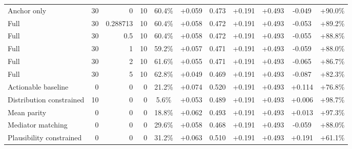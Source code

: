 \begin{table}[htbp]
\begin{tabular}{lrrrccccccc}
Anchor only & 30 & 0 & 10 & 60.4\% & +0.059 & 0.473 & +0.191 & +0.493 & -0.049 & +90.0\% \\
Full & 30 & 0.288713 & 10 & 60.4\% & +0.058 & 0.472 & +0.191 & +0.493 & -0.053 & +89.2\% \\
Full & 30 & 0.5 & 10 & 60.4\% & +0.058 & 0.472 & +0.191 & +0.493 & -0.055 & +88.8\% \\
Full & 30 & 1 & 10 & 59.2\% & +0.057 & 0.471 & +0.191 & +0.493 & -0.059 & +88.0\% \\
Full & 30 & 2 & 10 & 61.6\% & +0.055 & 0.471 & +0.191 & +0.493 & -0.065 & +86.7\% \\
Full & 30 & 5 & 10 & 62.8\% & +0.049 & 0.469 & +0.191 & +0.493 & -0.087 & +82.3\% \\
Actionable baseline & 0 & 0 & 0 & 21.2\% & +0.074 & 0.520 & +0.191 & +0.493 & +0.114 & +76.8\% \\
Distribution constrained & 10 & 0 & 0 & 5.6\% & +0.053 & 0.489 & +0.191 & +0.493 & +0.006 & +98.7\% \\
Mean parity & 0 & 0 & 0 & 18.8\% & +0.062 & 0.493 & +0.191 & +0.493 & +0.013 & +97.3\% \\
Mediator matching & 0 & 0 & 0 & 29.6\% & +0.058 & 0.468 & +0.191 & +0.493 & -0.059 & +88.0\% \\
Plausibility constrained & 0 & 0 & 0 & 31.2\% & +0.063 & 0.510 & +0.191 & +0.493 & +0.191 & +61.1\% \\
\bottomrule
\end{tabular}
\end{table}